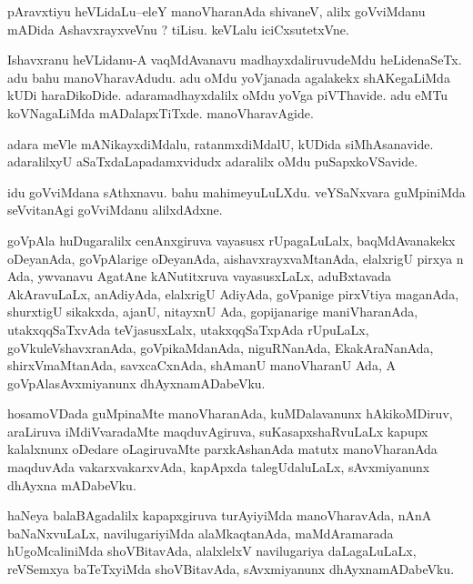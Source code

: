 \documentclass{article}
\begin{document}
\begin{mn}%
pAravxtiyu heVLidaLu--eleY manoVharanAda shivaneV, alilx goVviMdanu mADida AshavxrayxveVnu 
? tiLisu. keVLalu iciCxsutetxVne.
\end{mn}

\begin{mn}%
Ishavxranu heVLidanu-A vaqMdAvanavu madhayxdaliruvudeMdu heLidenaSeTx. adu bahu 
manoVharavAdudu. adu oMdu yoVjanada agalakekx shAKegaLiMda kUDi haraDikoDide. 
adaramadhayxdalilx oMdu yoVga piVThavide. adu eMTu koVNagaLiMda mADalapxTiTxde. 
manoVharavAgide.
\end{mn}

\begin{mn}%
adara meVle mANikayxdiMdalu, ratanmxdiMdalU, kUDida siMhAsanavide. adaralilxyU 
aSaTxdaLapadamxvidudx adaralilx oMdu puSapxkoVSavide.
\end{mn}

\begin{mn}%
idu goVviMdana sAthxnavu. bahu mahimeyuLuLXdu. veYSaNxvara guMpiniMda seVvitanAgi goVviMdanu
alilxdAdxne.
\end{mn}

\begin{mn}%
goVpAla huDugaralilx cenAnxgiruva vayasusx rUpagaLuLalx, baqMdAvanakekx oDeyanAda, 
goVpAlarige oDeyanAda, aishavxrayxvaMtanAda, elalxrigU pirxya n Ada, ywvanavu AgatAne 
kANutitxruva vayasusxLaLx, aduBxtavada AkAravuLaLx, anAdiyAda, elalxrigU AdiyAda, 
goVpanige  pirxVtiya maganAda, shurxtigU sikakxda, ajanU, nitayxnU Ada, gopijanarige 
maniVharanAda, utakxqqSaTxvAda teVjasusxLalx, utakxqqSaTxpAda rUpuLaLx, 
goVkuleVshavxranAda, goVpikaMdanAda, niguRNanAda, EkakAraNanAda, shirxVmaMtanAda, 
savxcaCxnAda, shAmanU manoVharanU Ada, A goVpAlasAvxmiyanunx dhAyxnamADabeVku. 
\end{mn}

\begin{mn}%
hosamoVDada guMpinaMte manoVharanAda, kuMDalavanunx hAkikoMDiruv, araLiruva iMdiVvaradaMte 
maqduvAgiruva, suKasapxshaRvuLaLx kapupx kalalxnunx oDedare oLagiruvaMte parxkAshanAda matutx
manoVharanAda maqduvAda vakarxvakarxvAda, kapApxda talegUdaluLaLx, sAvxmiyanunx dhAyxna 
mADabeVku.
\end{mn}

\begin{mn}%
haNeya balaBAgadalilx kapapxgiruva turAyiyiMda manoVharavAda, nAnA baNaNxvuLaLx, 
navilugariyiMda alaMkaqtanAda, maMdAramarada hUgoMcaliniMda shoVBitavAda, alalxlelxV 
navilugariya daLagaLuLaLx, reVSemxya baTeTxyiMda shoVBitavAda, sAvxmiyanunx dhAyxnamADabeVku.
\end{mn}
\end{document}
